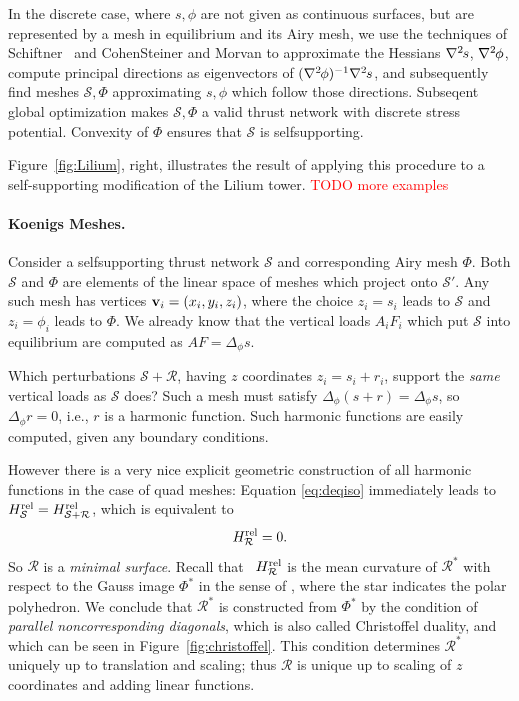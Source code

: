 \documentclass[annual]{acmsiggraph}
\def\rel{{\mathord{\text{\rm rel}}}}
\def\ess{s}
\def\Hess#1{{\def\testess{#1}\nabla^2\ifx\testess\ess\!s\else #1\fi}}
\def\Hess#1{\text{$\nabla^2\hskip-.2ex #1$}}
\def\SS{{\mathcal S}}
\def\RR{{\mathcal R}}
\newcommand{\todo}[1]{\textcolor{red}{#1}}
\begin{document}
In the discrete case, where $s,\phi$ are not given as continuous surfaces,
but are represented by a mesh in equilibrium and its Airy mesh, we use the
techniques of Schiftner~ and Cohen\dash Steiner
and Morvan  to approximate the Hessians
$\Hess s$, $\Hess\phi$, compute principal directions as eigenvectors of
$(\Hess\phi)^{-1}\Hess s$, and subsequently find meshes $\SS,\Phi$
approximating $s,\phi$ which follow those directions. Subseqent global
optimization makes $\SS,\Phi$ a valid thrust network with discrete stress
potential. Convexity of $\Phi$ ensures that $\SS$ is self\dash supporting.

Figure~\ref{fig:Lilium}, right, illustrates the result of applying this procedure
to a self-supporting modification of the Lilium tower. \todo{TODO more examples}

\paragraph{Koenigs Meshes.}
Consider a self\dash supporting thrust network $\SS$ and corresponding
Airy mesh $\Phi$. Both $\SS$ and $\Phi$ are elements of the linear space of
meshes which project onto $\SS'$. Any such mesh has vertices
${\mathbf v}_i=(x_i,y_i,z_i)$, where the choice $z_i=s_i$ leads to $\SS$ and
$z_i=\phi_i$ leads to $\Phi$. We already know that the vertical loads
$A_iF_i$ which put $\SS$ into equilibrium are computed as
$AF=\Delta_\phi s$.

Which perturbations $\SS+\RR$, having $z$ coordinates $z_i =
s_i+r_i$, support the {\em same} vertical loads as $\SS$ does? Such a mesh must satisfy
$\Delta_\phi(s+r)=\Delta_\phi s$, so $\Delta_\phi r = 0$, i.e.,
$r$ is a harmonic function. Such harmonic functions are easily computed, given any boundary
conditions.

However there is a very nice explicit geometric construction of all
harmonic functions in the case of quad meshes: Equation \eqref{eq:deqiso}
immediately leads to $H^\rel_\SS=H^\rel_{\SS+\RR}$, which is equivalent to
	$$
	H^\rel_\RR = 0.
	$$
 So $\RR$ is a {\em minimal surface}. Recall that \ $H^\rel_\RR$ is the
mean curvature of $\RR^*$ with respect to the Gauss image $\Phi^*$ in the
sense of \cite{Pottmann2007b}, where the star indicates the polar
polyhedron. We conclude that $\RR^*$ is constructed from $\Phi^*$ by the
condition of {\em parallel non\dash corresponding diagonals}, which is
also called Christoffel duality, and which can be seen in
Figure~\ref{fig:christoffel}. This condition determines $\RR^*$ uniquely
up to translation and scaling; thus $\RR$ is unique up to
scaling of $z$ coordinates and adding linear functions.
\end{document}
